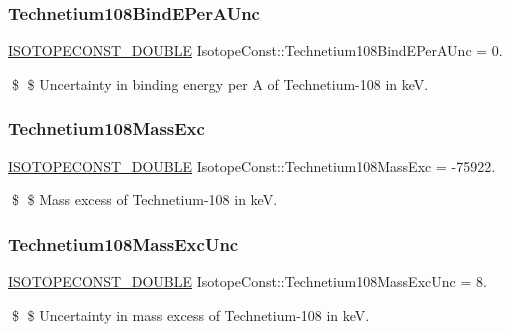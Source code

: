 \subsubsection{\texorpdfstring{Technetium108\+Bind\+E\+Per\+A\+Unc}{Technetium108BindEPerAUnc}}
{\footnotesize\ttfamily \mbox{\hyperlink{group___isotope_const-_macros_ga8f45a7272ce02c0b4c65c44636ed719a}{I\+S\+O\+T\+O\+P\+E\+C\+O\+N\+S\+T\+\_\+\+D\+O\+U\+B\+LE}} Isotope\+Const\+::\+Technetium108\+Bind\+E\+Per\+A\+Unc = 0.}

\$ \$ Uncertainty in binding energy per A of Technetium-\/108 in keV. \mbox{\label{group___isotope_const-_technetium-_tc108_gae8c158e1d256861e052cad27cd24cd98}} 
\subsubsection{\texorpdfstring{Technetium108\+Mass\+Exc}{Technetium108MassExc}}
{\footnotesize\ttfamily \mbox{\hyperlink{group___isotope_const-_macros_ga8f45a7272ce02c0b4c65c44636ed719a}{I\+S\+O\+T\+O\+P\+E\+C\+O\+N\+S\+T\+\_\+\+D\+O\+U\+B\+LE}} Isotope\+Const\+::\+Technetium108\+Mass\+Exc = -\/75922.}

\$ \$ Mass excess of Technetium-\/108 in keV. \mbox{\label{group___isotope_const-_technetium-_tc108_gaedebbea53b7a313f069d5c4d52e55e3d}} 
\subsubsection{\texorpdfstring{Technetium108\+Mass\+Exc\+Unc}{Technetium108MassExcUnc}}
{\footnotesize\ttfamily \mbox{\hyperlink{group___isotope_const-_macros_ga8f45a7272ce02c0b4c65c44636ed719a}{I\+S\+O\+T\+O\+P\+E\+C\+O\+N\+S\+T\+\_\+\+D\+O\+U\+B\+LE}} Isotope\+Const\+::\+Technetium108\+Mass\+Exc\+Unc = 8.}

\$ \$ Uncertainty in mass excess of Technetium-\/108 in keV. \mbox{\label{group___isotope_const-_technetium-_tc108_ga97ecae767091d6bda25f43b24c4596dc}} 
